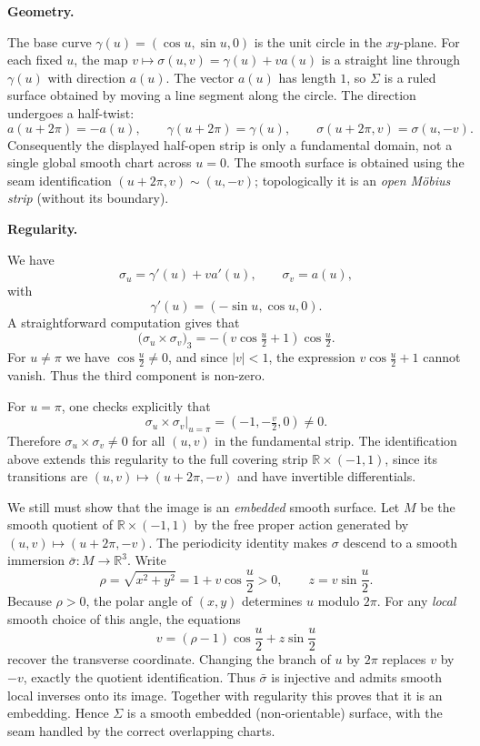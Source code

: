 \begin{solution}
\par\medskip\noindent\textbf{Geometry.}\par\smallskip

The base curve $\gamma(u)=(\cos u,\sin u,0)$ is the unit circle in the $xy$-plane.
For each fixed $u$, the map $v\mapsto \sigma(u,v)=\gamma(u)+v a(u)$ is a straight
line through $\gamma(u)$ with direction $a(u)$.
The vector $a(u)$ has length $1$, so $\Sigma$ is a ruled surface obtained by
moving a line segment along the circle.  The direction undergoes a half-twist:
\[
a(u+2\pi)=-a(u),\qquad \gamma(u+2\pi)=\gamma(u),\qquad
\sigma(u+2\pi,v)=\sigma(u,-v).
\]
Consequently the displayed half-open strip is only a fundamental domain,
not a single global smooth chart across $u=0$.  The smooth surface is
obtained using the seam identification $(u+2\pi,v)\sim(u,-v)$;
topologically it is an \emph{open M\"obius strip} (without its boundary).

\par\medskip\noindent\textbf{Regularity.}\par\smallskip

We have
\[
\sigma_u=\gamma'(u)+v a'(u),\qquad
\sigma_v=a(u),
\]
with
\[
\gamma'(u)=(-\sin u,\cos u,0).
\]
A straightforward computation gives that
\[
\bigl(\sigma_u\times\sigma_v\bigr)_3
=-(v\cos\tfrac u2+1)\cos\tfrac u2.
\]
For $u\neq \pi$ we have $\cos\tfrac u2\neq 0$, and since $|v|<1$,
the expression $v\cos\tfrac u2 + 1$ cannot vanish.  Thus the third
component is non-zero.

For $u=\pi$, one checks explicitly that
\[
\sigma_u\times\sigma_v\big|_{u=\pi}=(-1,-\tfrac v2,0)\neq 0.
\]
Therefore $\sigma_u\times\sigma_v\neq 0$ for all $(u,v)$ in the
fundamental strip.  The identification above extends this regularity to the
full covering strip $\mathbb R\times(-1,1)$, since its transitions are
$(u,v)\mapsto(u+2\pi,-v)$ and have invertible differentials.

We still must show that the image is an \emph{embedded} smooth surface.
Let $M$ be the smooth quotient of $\mathbb R\times(-1,1)$ by the free
proper action generated by $(u,v)\mapsto(u+2\pi,-v)$.  The periodicity
identity makes $\sigma$ descend to a smooth immersion $\bar\sigma:M\to
\mathbb R^3$.  Write
\[
\rho=\sqrt{x^2+y^2}=1+v\cos\frac u2>0,\qquad
z=v\sin\frac u2.
\]
Because $\rho>0$, the polar angle of $(x,y)$ determines $u$ modulo
$2\pi$.  For any \emph{local} smooth choice of this angle, the equations
\[
 v=(\rho-1)\cos\frac u2+z\sin\frac u2
\]
recover the transverse coordinate. Changing the branch of $u$ by $2\pi$
replaces $v$ by $-v$, exactly the quotient identification.
Thus $\bar\sigma$ is injective and admits smooth local inverses onto
its image.  Together with regularity this proves that it is an
embedding.  Hence $\Sigma$ is a smooth embedded (non-orientable)
surface, with the seam handled by the correct overlapping charts.


\end{solution}
